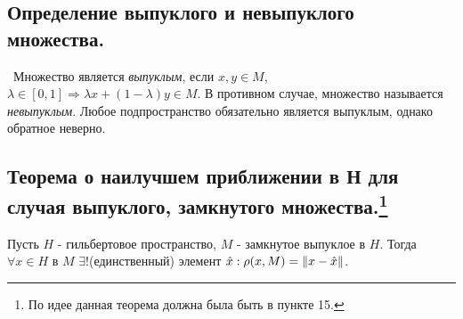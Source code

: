 \subsection*{Определение выпуклого и невыпуклого множества.}

\noindent \textasteriskcentered~Множество является \textit{выпуклым}, если $x, y \in M$, $\lambda \in [0, 1] \Rightarrow \lambda x + (1 - \lambda) y \in M$. В противном 
случае, множество называется \textit{невыпуклым}. Любое подпространство обязательно является выпуклым, однако обратное неверно.



\subsection*{Теорема о наилучшем приближении в Н для случая выпуклого, замкнутого множества.\footnote{По идее данная теорема должна была быть в пункте 15.}}

\begin{theorem*}
Пусть $H$ - гильбертовое пространство, $M$ - замкнутое выпуклое в $H$. Тогда $\forall x \in H$ в $M$ $\exists !$(единственный) элемент $\hat{x} : 
\rho(x, M) = \left\lVert x - \hat{x}\right\rVert$.
\end{theorem*}

